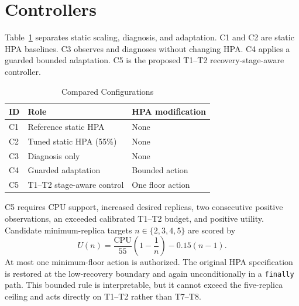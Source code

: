 \documentclass[10pt,twocolumn]{article}
\begin{document}
\section{Controllers}
Table~\ref{tab:treatments} separates static scaling, diagnosis, and adaptation. C1 and C2 are static HPA baselines. C3 observes and diagnoses without changing HPA. C4 applies a guarded bounded adaptation. C5 is the proposed T1--T2 recovery-stage-aware controller.

\begin{table}[t]
\centering
\caption{Compared Configurations}
\label{tab:treatments}
\begin{tabular}{lll}
\toprule
ID & Role & HPA modification\\
\midrule
C1 & Reference static HPA & None\\
C2 & Tuned static HPA (55\%) & None\\
C3 & Diagnosis only & None\\
C4 & Guarded adaptation & Bounded action\\
C5 & T1--T2 stage-aware control & One floor action\\
\bottomrule
\end{tabular}
\end{table}

C5 requires CPU support, increased desired replicas, two consecutive positive observations, an exceeded calibrated T1--T2 budget, and positive utility. Candidate minimum-replica targets $n\in\{2,3,4,5\}$ are scored by
\begin{equation}
U(n)=\frac{\mathrm{CPU}}{55}\left(1-\frac{1}{n}\right)-0.15(n-1).
\end{equation}
At most one minimum-floor action is authorized. The original HPA specification is restored at the low-recovery boundary and again unconditionally in a \texttt{finally} path. This bounded rule is interpretable, but it cannot exceed the five-replica ceiling and acts directly on T1--T2 rather than T7--T8.

\begin{table}[t]
\centering
\caption{C5 Production Decision and Restoration Rules}
\label{tab:rules}
\end{table}
\end{document}
